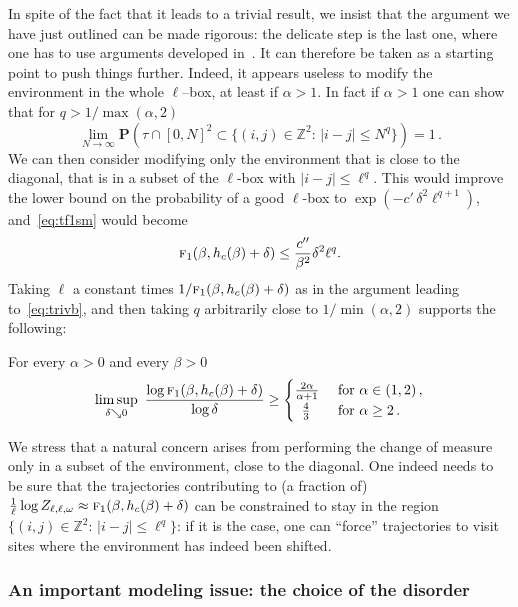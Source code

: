 \documentclass[10pt]{amsart}
\theoremstyle{definition}\newtheorem{defi}[theo]{Definition}\newtheorem{rema}[theo]{Remark}\newtheorem{exam}[theo]{Example}\newtheorem{exem}[theo]{Example}\newtheorem{nota}[theo]{Notation}
\newcommand{\ga}{\alpha}
\newcommand{\gb}{\beta}
\newcommand{\gd}{\delta}
\newcommand{\go}{\omega}
\newcommand{\tf}{\textsc{f}} %
\newcommand{\bP}{\ensuremath{\mathbf{P}}}
\newcommand{\bbZ}{\ensuremath{\mathbb{Z}}}
\begin{document}
In spite of the fact that it leads to a trivial result, we insist that the argument we have just outlined can be made rigorous: the delicate step is the last one, where one has to use arguments developed in~\cite{cf:GTalea}. It can therefore be taken as a starting point to push things further. Indeed, it appears useless to modify the environment in the whole $\ell$--box, at least if $\ga>1$. In fact if $\ga>1$ one can show that for $q>1/ \max(\ga,2)$
\begin{equation}\label{eq:evin}
\lim_{N \to \infty}\bP \left(\tau \cap [0, N]^2 \subset \{(i,j) \in \bbZ^2:\,\vert i-j \vert \le N^q \}\right)= 1\,.
\end{equation}
We can then consider modifying only the environment that is close to the diagonal, that is in a subset of the $\ell$-box with $|i-j|\leq \ell^q$. This would improve the lower bound on the probability of a good $\ell$-box to $\exp(- c'\,\gd^2 \ell^{q+1})$, and~\eqref{eq:tf1sm} would become
\[
\tf_1(\gb,h_c(\gb)+\gd) \leq \frac{c''}{\gb^2} \gd^2 \ell^{q}.
\]
Taking $\ell$ a constant times $1/\tf_1(\gb,h_c(\gb)+\gd)$ as in the argument leading to~\eqref{eq:trivb}, and then taking $q$ arbitrarily close to $1/\min(\alpha,2)$ supports the following:
\begin{conj}
For every $\ga>0$ and every $\gb >0$\label{conj:smoothing}
\begin{equation}
\limsup_{\gd \searrow 0} \
\frac{\log \tf_1 (\gb, h_c(\gb)+\gd) }{\log \gd}\ge
\begin{cases}
\frac{2\ga}{\ga+1} & \text{ for } \ga \in (1,2)\,,
\\
\;\:\frac{4}{3} & \text{ for } \ga \ge 2\,.
\end{cases}
\end{equation}
\end{conj}

We stress that a natural concern arises from performing the change of measure only in a subset of the environment, close to the diagonal. One indeed needs to be sure that the trajectories contributing to (a fraction of) $ \frac{1}{\ell} \log Z_{\ell,\ell,\go} \approx \tf_1(\gb,h_c(\gb)+\gd)$ can be constrained to stay in the region $\{(i,j) \in \bbZ^2:\,\vert i-j \vert \le \ell^q \}$: if it is the case, one can ``force'' trajectories to visit sites where the environment has indeed been shifted.

\subsubsection{An important modeling issue: the choice of the disorder}
\end{document}
